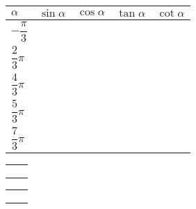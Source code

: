 \vspace{2em}
\lianxi
\begin{xiaotis}
\setcounter{cntxiaoti}{0}


\begin{table}[H]
    \renewcommand\arraystretch{2}
    \hspace{4em}
    \begin{tabular}{|w{c}{4em}|*{4}{w{c}{6em}|}}
        \hline
        $\alpha$ & $\sin \alpha$ & $\cos \alpha$ & $\tan \alpha$ & $\cot \alpha$ \\ \hline
        $-\dfrac \pi 3$ &  \\ \hline
        $\dfrac 2 3 \pi$ &  \\ \hline
        $\dfrac 4 3 \pi$ &  \\ \hline
        $\dfrac 5 3 \pi$ &  \\ \hline
        $\dfrac 7 3 \pi$ &  \\ \hline
    \end{tabular}
\end{table}

\begin{xiaoxiaotis}

    \renewcommand\arraystretch{2}
    \begin{tabular}[t]{*{2}{@{}p{15em}}}
         &  \\
         &  \\
         & 
    \end{tabular}

\end{xiaoxiaotis}

\begin{xiaoxiaotis}

    \renewcommand\arraystretch{2}
    \begin{tabular}[t]{*{2}{@{}p{15em}}}
         &  \\
         &  \\
         & 
    \end{tabular}


\end{xiaoxiaotis}
\end{xiaotis}
